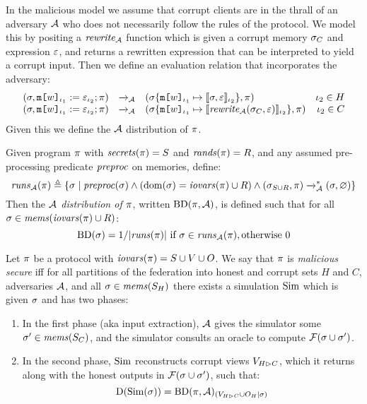 In the malicious model we assume that corrupt clients are in the thrall of an
adversary $\mathcal{A}$ who does not necessarily follow the rules of the protocol.
We model this by positing a $\mathit{rewrite}_{\mathcal{A}}$ function which is given a corrupt memory
$\sigma_C$ and expression $\varepsilon$, and returns a rewritten expression that can
be interpreted to yield a corrupt input. Then we define an evaluation
relation that incorporates the adversary:
$$
\begin{array}{rclr}
  (\sigma, \texttt{m[}w\texttt{]}_{\iota_1} := \varepsilon_{\iota_2};\pi) &\xrightarrow{}_{\mathcal{A}}&
  (\sigma\{\texttt{m[}w\texttt{]}_{\iota_1} \mapsto \llbracket \sigma,\varepsilon \rrbracket_{\iota_2}\}, \pi) & \iota_2 \in H\\
  (\sigma, \texttt{m[}w\texttt{]}_{\iota_1} := \varepsilon_{\iota_2};\pi) &\xrightarrow{}_{\mathcal{A}}&
  (\sigma\{\texttt{m[}w\texttt{]}_{\iota_1} \mapsto \llbracket \mathit{rewrite}_{\mathcal{A}}(\sigma_C,\varepsilon) \rrbracket_{\iota_2}\}, \pi) & \iota_2 \in C
\end{array}
$$
Given this we define the $\mathcal{A}$ distribution of $\pi$. 
\begin{definition}
  \label{def-progd}
  \label{definition-progd}
  Given program $\pi$ with $\mathit{secrets}(\pi) = S$ and $\mathit{rands}(\pi) = R$, and
  any assumed pre-processing predicate $\mathit{preproc}$ on memories, define:
  $$
  \mathit{runs}_{\mathcal{A}}(\pi) \triangleq \{ \sigma \mid \mathit{preproc}(\sigma) \wedge
  (\mathrm{dom}(\sigma) = \mathit{iovars}(\pi) \cup R) \wedge (\sigma_{S \cup R},\pi) \xrightarrow{}_{\mathcal{A}}^* (\sigma,\varnothing) \}
  $$
  Then the \emph{$\mathcal{A}$ distribution of $\pi$}, written $\mathrm{BD}(\pi,\mathcal{A})$, is
  defined such that for all $\sigma \in \mathit{mems}(\mathit{iovars}(\pi) \cup R)$:
  $$
  \progtt(\store) =  1 / |\runs(\prog)| \ \text{if}\ \store \in \aruns(\prog), \text{otherwise}\ 0
  $$
\end{definition}

\begin{definition}
  Let $\pi$ be a protocol with $\mathit{iovars}(\pi) = S \cup V \cup O$. We say that
  $\pi$ is \emph{malicious secure} iff for all
  partitions of the federation into honest and corrupt sets $H$ and $C$,
  adversaries $\mathcal{A}$, 
  and all $\sigma \in \mathit{mems}(S_H)$ there exists a
  simulation $\mathrm{Sim}$ which is given $\sigma$ and has two phases:
  \begin{enumerate}
  \item In the first phase (aka input extraction), $\mathcal{A}$ gives the
    simulator some $\sigma' \in \mathit{mems}(S_C)$, and the simulator consults an
    oracle to compute $\mathcal{F}(\sigma \cup \sigma')$.
  \item In the second phase, $\mathrm{Sim}$ reconstructs corrupt views $V_{H \rhd C}$,
    which it returns along with the honest outputs in $\mathcal{F}(\sigma \cup \sigma')$, such that:
    $$
    \mathrm{D}(\mathrm{Sim}(\sigma)) = \mathrm{BD}(\pi,\mathcal{A})_{({V_{H \rhd C} \cup O_H}|{\sigma})}
    $$
  \end{enumerate}
\end{definition}
